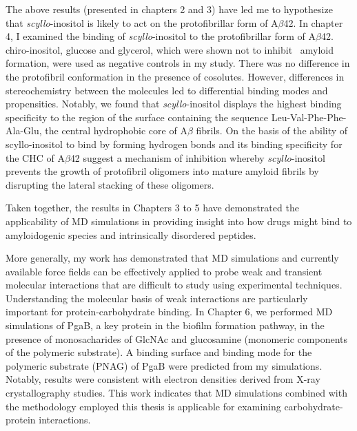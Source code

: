 The above results (presented in chapters 2 and 3) have led me to hypothesize that \textit{scyllo}-inositol is likely to act on the protofibrillar form of A$\beta$42.  In chapter 4, I examined the binding of \textit{scyllo}-inositol to the protofibrillar form of A$\beta$42. chiro-inositol, glucose and glycerol, which were shown not to inhibit \ amyloid formation, were used as negative controls in my study. There was no difference in the protofibril conformation in the presence of cosolutes. However, differences in stereochemistry between the molecules led to differential binding modes and propensities. Notably, we found that \textit{scyllo}-inositol displays the highest binding specificity to the region of the surface containing the sequence Leu-Val-Phe-Phe-Ala-Glu, the central hydrophobic core of A$\beta$ fibrils.  On the basis of the ability of scyllo-inositol to bind by forming hydrogen bonds and its binding specificity for the CHC of A$\beta$42 suggest a mechanism of inhibition whereby \textit{scyllo}-inositol prevents the growth of protofibril oligomers into mature amyloid fibrils by disrupting the lateral stacking of these oligomers.

Taken together, the results in Chapters 3 to 5 have demonstrated the applicability of MD simulations in providing insight into how drugs might bind to amyloidogenic species and intrinsically disordered peptides. 

More generally, my work has demonstrated that MD simulations and currently available force fields can be effectively applied to probe weak and transient molecular interactions that are difficult to study using experimental techniques. Understanding the molecular basis of weak interactions are particularly important for protein-carbohydrate binding.\cite{Canchi:2011cg,Fadda:2010p5889}
In Chapter 6, we performed MD simulations of PgaB, a key protein in the biofilm formation pathway, in the presence of monosacharides of GlcNAc and glucosamine (monomeric components of the polymeric substrate). A binding surface and binding mode for the polymeric substrate (PNAG) of PgaB were predicted from my simulations. Notably, results were consistent with electron densities derived from X-ray crystallography studies. This work indicates that MD simulations combined with the methodology employed this thesis is applicable for examining carbohydrate-protein interactions.


